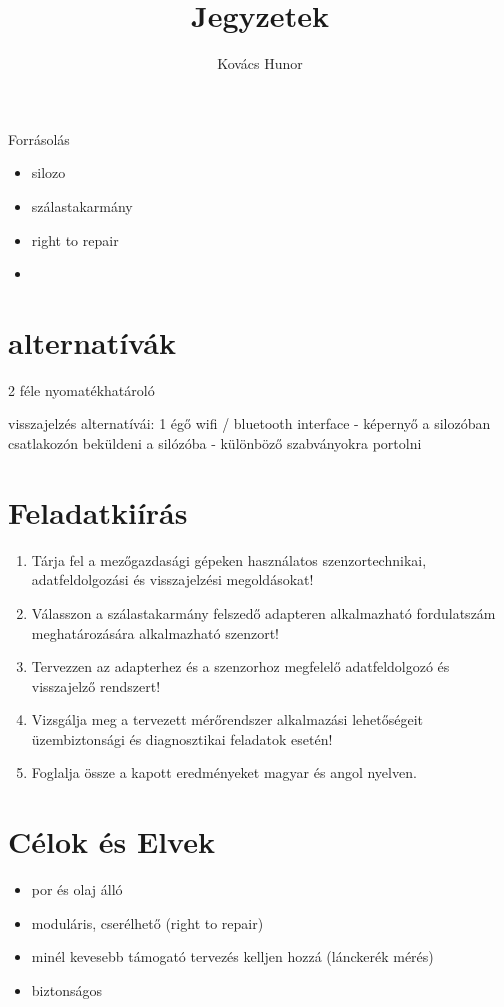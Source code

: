 \documentclass{article}
\title{Jegyzetek}
\author{Kovács Hunor}
\begin{document}
	\maketitle
	
	Forrásolás
	\begin{itemize}
		\item silozo
		\item szálastakarmány
		\item right to repair
		\item 
	\end{itemize}
	
	
	\section{alternatívák}
	
	2 féle nyomatékhatároló
	
	visszajelzés alternatívái:
	1 égő
	wifi / bluetooth interface - képernyő a silozóban
	csatlakozón beküldeni a silózóba - különböző szabványokra portolni
	
	\section{Feladatkiírás}
	
	\begin{enumerate}
		
		\item Tárja fel a mezőgazdasági gépeken használatos szenzortechnikai, adatfeldolgozási és visszajelzési megoldásokat!
		\item Válasszon a szálastakarmány felszedő adapteren alkalmazható fordulatszám meghatározására alkalmazható szenzort!
		\item Tervezzen az adapterhez és a szenzorhoz megfelelő adatfeldolgozó és visszajelző rendszert!
		\item Vizsgálja meg a tervezett mérőrendszer alkalmazási lehetőségeit üzembiztonsági és diagnosztikai feladatok esetén!
		\item Foglalja össze a kapott eredményeket magyar és angol nyelven.
	\end{enumerate}
	
	\section{Célok és Elvek}
	
	\begin{itemize}
		\item por és olaj álló
		\item moduláris, cserélhető (right to repair)
		\item minél kevesebb támogató tervezés kelljen hozzá (lánckerék mérés)
		\item biztonságos
	\end{itemize}
	
\end{document}
